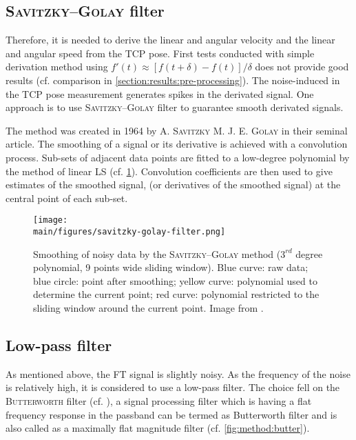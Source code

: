 \documentclass[/home/francois/latex/report/main.tex]{subfiles}
\begin{document}
\subsection{\textsc{Savitzky–Golay} filter}

Therefore, it is needed to derive the linear and angular velocity and the linear and angular speed from the \ac{TCP} pose. First tests conducted with simple derivation method using $f'(t) \approx  [f(t+\delta) - f(t)] / \delta$ does not provide good results (cf. comparison in \ref{section:results:pre-processing}). The noise-induced in the \ac{TCP} pose measurement generates spikes in the derivated signal. One approach is to use \textsc{Savitzky–Golay} filter to guarantee smooth derivated signals.

The method was created in 1964 by A. \textsc{Savitzky} M. J. E. \textsc{Golay} \cite{Savitzky1964} in their seminal article. The smoothing of a signal or its derivative is achieved with a convolution process. Sub-sets of adjacent data points are fitted to a low-degree polynomial by the method of linear \ac{LS} (cf. \ref{fig:method:savit}). Convolution coefficients are then used to give estimates of the smoothed signal, (or derivatives of the smoothed signal) at the central point of each sub-set.

\begin{figure}[h]
  \centering
  \texttt{[image: \\main/figures/savitzky-golay-filter.png]}
  \caption{Smoothing of noisy data by the \textsc{Savitzky–Golay} method ($3^{rd}$ degree polynomial, 9 points wide sliding window). Blue curve: raw data; blue circle: point after smoothing; yellow curve: polynomial used to determine the current point; red curve: polynomial restricted to the sliding window around the current point. Image from \cite{Cdang2013}.}
  \label{fig:method:savit}
\end{figure}

\subsection{Low-pass filter}

As mentioned above, the \ac{FT} signal is slightly noisy. As the frequency of the noise is relatively high, it is considered to use a low-pass filter. The choice fell on the \textsc{Butterworth} filter (cf. \cite{filter1923}), a signal processing filter which is having a flat frequency response in the passband can be termed as Butterworth filter and is also called as a maximally flat magnitude filter (cf. \ref{fig:method:butter}).
\end{document}
